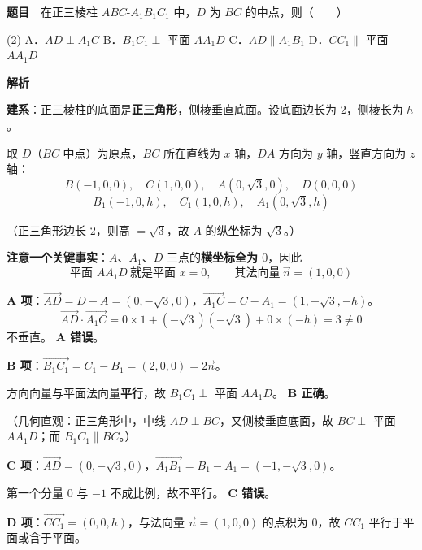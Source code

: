 \par\medskip



\textbf{题目}　在正三棱柱 $ABC\text{-}A_1B_1C_1$ 中，$D$ 为 $BC$ 的中点，则（　　）

\begin{gkopts}(2)
\task A．$AD\perp A_1C$
\task B．$B_1C_1\perp$ 平面 $AA_1D$
\task C．$AD\parallel A_1B_1$
\task D．$CC_1\parallel$ 平面 $AA_1D$
\end{gkopts}

\textbf{解析}

\textbf{建系}：正三棱柱的底面是\textbf{正三角形}，侧棱垂直底面。设底面边长为 $2$，侧棱长为 $h$。

取 $D$（$BC$ 中点）为原点，$BC$ 所在直线为 $x$ 轴，$DA$ 方向为 $y$ 轴，竖直方向为 $z$ 轴：
\[B(-1,0,0),\quad C(1,0,0),\quad A\left(0,\sqrt3,0\right),\quad D(0,0,0)\]
\[B_1(-1,0,h),\quad C_1(1,0,h),\quad A_1\left(0,\sqrt3,h\right)\]

（正三角形边长 $2$，则高 $=\sqrt3$，故 $A$ 的纵坐标为 $\sqrt3$。）

\textbf{注意一个关键事实}：$A$、$A_1$、$D$ 三点的\textbf{横坐标全为 $0$}，因此
\[\text{平面 }AA_1D\ \text{就是平面 }x=0,\qquad\text{其法向量}\ \vec n=(1,0,0)\]

\par\medskip

\textbf{A 项}：$\overrightarrow{AD}=D-A=\left(0,-\sqrt3,0\right)$，$\overrightarrow{A_1C}=C-A_1=\left(1,-\sqrt3,-h\right)$。
\[\overrightarrow{AD}\cdot\overrightarrow{A_1C}=0\times1+\left(-\sqrt3\right)\left(-\sqrt3\right)+0\times(-h)=3\ne0\]
不垂直。 \textbf{A 错误}。

\textbf{B 项}：$\overrightarrow{B_1C_1}=C_1-B_1=(2,0,0)=2\vec n$。

方向向量与平面法向量\textbf{平行}，故 $B_1C_1\perp$ 平面 $AA_1D$。 \textbf{B 正确}。

（几何直观：正三角形中，中线 $AD\perp BC$，又侧棱垂直底面，故 $BC\perp$ 平面 $AA_1D$；而 $B_1C_1\parallel BC$。）

\textbf{C 项}：$\overrightarrow{AD}=\left(0,-\sqrt3,0\right)$，$\overrightarrow{A_1B_1}=B_1-A_1=\left(-1,-\sqrt3,0\right)$。

第一个分量 $0$ 与 $-1$ 不成比例，故不平行。 \textbf{C 错误}。

\textbf{D 项}：$\overrightarrow{CC_1}=(0,0,h)$，与法向量 $\vec n=(1,0,0)$ 的点积为 $0$，故 $CC_1$ 平行于平面或含于平面。

